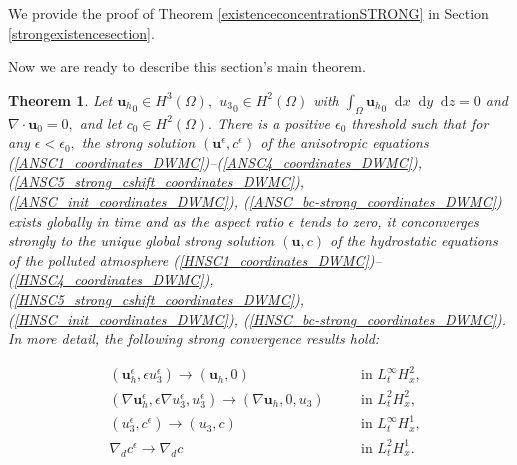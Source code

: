 \documentclass[12pt]{report}
\newtheorem{theorem}{Theorem}
\numberwithin{theorem}{chapter}
\numberwithin{corollary}{chapter}
\numberwithin{lemma}{chapter}
\numberwithin{remark}{chapter}
\numberwithin{definition}{chapter}
\numberwithin{prop}{chapter}
\newcommand*\diff{\mathop{}\!\mathrm{d}}
\begin{document}
We provide the proof of Theorem \ref{existenceconcentrationSTRONG} in Section \ref{strongexistencesection}.

Now we are ready to describe this section's main theorem.

\begin{theorem} \label{maintheoremSTRONG}
Let ${\mathbf{u}_h}_0 \in H^3(\Omega),$ ${u_3}_0 \in H^2(\Omega)$ with $\int_\Omega {\mathbf{u}_h}_0 \diff x \diff y \diff z = 0$ and $\nabla \cdot \mathbf{u}_0 = 0,$ and let $c_0 \in H^2 (\Omega).$ There is a positive $\epsilon_0$ threshold such that for any $\epsilon < \epsilon_0,$ the strong solution $(\mathbf{u}^\epsilon, c^\epsilon)$ of the anisotropic equations (\ref{ANSC1_coordinates_DWMC})--(\ref{ANSC4_coordinates_DWMC}), (\ref{ANSC5_strong_cshift_coordinates_DWMC}), (\ref{ANSC_init_coordinates_DWMC}), (\ref{ANSC_bc-strong_coordinates_DWMC}) exists globally in time and as the aspect ratio $\epsilon$ tends to zero, it conconverges strongly to the unique global strong solution $(\mathbf{u}, c)$ of the hydrostatic equations of the polluted atmosphere (\ref{HNSC1_coordinates_DWMC})--(\ref{HNSC4_coordinates_DWMC}), (\ref{HNSC5_strong_cshift_coordinates_DWMC}), (\ref{HNSC_init_coordinates_DWMC}), (\ref{HNSC_bc-strong_coordinates_DWMC}). In more detail, the following strong convergence results hold:

  \begin{align} 
    & (\mathbf{u}_h^\epsilon, \epsilon u_3^\epsilon) \to (\mathbf{u}_h, 0) &\quad & \text{in $L_t^\infty H_x^2$,} \label{StrongConvVelocity1statement} \\
    & (\nabla \mathbf{u}_h^\epsilon, \epsilon \nabla u_3^\epsilon, u_3^\epsilon) \to (\nabla \mathbf{u}_h, 0, u_3) &\quad & \text{in $L_t^2 H_x^2$,} \label{StrongConvVelocity2statement} \\ 
    & (u_3^\epsilon, c^\epsilon) \to (u_3, c) &\quad & \text{in $L_t^\infty H_x^1,$} \label{StrongConvVelocity3andConcentrationstatement} \\
    & \nabla_d c^\epsilon \to \nabla_d c &\quad & \text{in $L_t^2 H_x^1.$} \label{StrongConvConcentrationstatement}
  \end{align}

\end{theorem}
\end{document}
